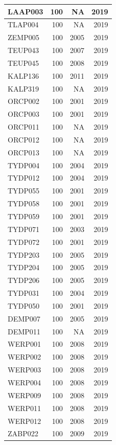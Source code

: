 \documentclass[11pt,]{book}
\begin{document}
\begin{table}
\begin{tabular}[t]{l|r|r|r}
\hline
LAAP003 & 100 & NA & 2019\\
\hline
TLAP004 & 100 & NA & 2019\\
\hline
ZEMP005 & 100 & 2005 & 2019\\
\hline
TEUP043 & 100 & 2007 & 2019\\
\hline
TEUP045 & 100 & 2008 & 2019\\
\hline
KALP136 & 100 & 2011 & 2019\\
\hline
KALP319 & 100 & NA & 2019\\
\hline
ORCP002 & 100 & 2001 & 2019\\
\hline
ORCP003 & 100 & 2001 & 2019\\
\hline
ORCP011 & 100 & NA & 2019\\
\hline
ORCP012 & 100 & NA & 2019\\
\hline
ORCP013 & 100 & NA & 2019\\
\hline
TYDP004 & 100 & 2004 & 2019\\
\hline
TYDP012 & 100 & 2004 & 2019\\
\hline
TYDP055 & 100 & 2001 & 2019\\
\hline
TYDP058 & 100 & 2001 & 2019\\
\hline
TYDP059 & 100 & 2001 & 2019\\
\hline
TYDP071 & 100 & 2003 & 2019\\
\hline
TYDP072 & 100 & 2001 & 2019\\
\hline
TYDP203 & 100 & 2005 & 2019\\
\hline
TYDP204 & 100 & 2005 & 2019\\
\hline
TYDP206 & 100 & 2005 & 2019\\
\hline
TYDP031 & 100 & 2004 & 2019\\
\hline
TYDP050 & 100 & 2001 & 2019\\
\hline
DEMP007 & 100 & 2005 & 2019\\
\hline
DEMP011 & 100 & NA & 2019\\
\hline
WERP001 & 100 & 2008 & 2019\\
\hline
WERP002 & 100 & 2008 & 2019\\
\hline
WERP003 & 100 & 2008 & 2019\\
\hline
WERP004 & 100 & 2008 & 2019\\
\hline
WERP009 & 100 & 2008 & 2019\\
\hline
WERP011 & 100 & 2008 & 2019\\
\hline
WERP012 & 100 & 2008 & 2019\\
\hline
ZABP022 & 100 & 2009 & 2019\\

\end{tabular}
\end{table}
\end{document}
